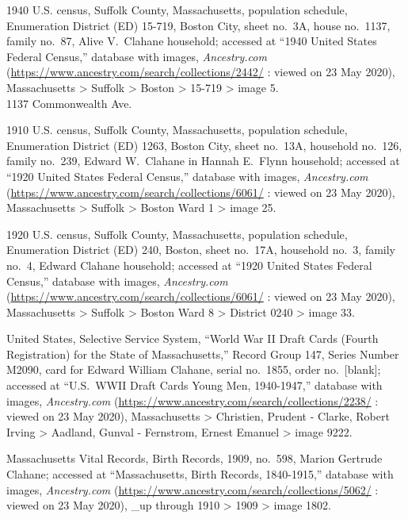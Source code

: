 \begin{thebibliography}{999}
	1940 U.S. census, Suffolk County, Massachusetts, population schedule, Enumeration District (ED) 15-719, Boston City, sheet no.\ 3A, house no.\ 1137, family no.\ 87, Alive V.\ Clahane household; accessed at ``1940 United States Federal Census,'' database with images, \textit{Ancestry.com} (\url{https://www.ancestry.com/search/collections/2442/} : viewed on 23 May 2020), Massachusetts > Suffolk > Boston > 15-719 > image 5.\\
	1137 Commonwealth Ave.
	
	1910 U.S. census, Suffolk County, Massachusetts, population schedule, Enumeration District (ED) 1263, Boston City, sheet no.\ 13A, household no.\ 126, family no.\ 239, Edward W.\ Clahane in Hannah E.\ Flynn household; accessed at ``1920 United States Federal Census,'' database with images, \textit{Ancestry.com} (\url{https://www.ancestry.com/search/collections/6061/} : viewed on 23 May 2020), Massachusetts > Suffolk > Boston Ward 1 > image 25.
	
	1920 U.S. census, Suffolk County, Massachusetts, population schedule, Enumeration District (ED) 240, Boston, sheet no.\ 17A, household no.\ 3, family no.\ 4, Edward Clahane household; accessed at ``1920 United States Federal Census,'' database with images, \textit{Ancestry.com} (\url{https://www.ancestry.com/search/collections/6061/} : viewed on 23 May 2020), Massachusetts > Suffolk > Boston Ward 8 > District 0240 > image 33.
	
	United States, Selective Service System, ``World War II Draft Cards (Fourth Registration) for the State of Massachusetts,'' Record Group 147, Series Number M2090, card for Edward William Clahane, serial no.\ 1855, order no.\ [blank]; accessed at ``U.S.\ WWII Draft Cards Young Men, 1940-1947,'' database with images, \textit{Ancestry.com} (\url{https://www.ancestry.com/search/collections/2238/} : viewed on 23 May 2020), Massachusetts > Christien, Prudent - Clarke, Robert Irving > Aadland, Gunval - Fernstrom, Ernest Emanuel > image 9222.
	
	Massachusetts Vital Records, Birth Records, 1909, no.\ 598, Marion Gertrude Clahane; accessed at ``Massachusetts, Birth Records, 1840-1915,'' database with images, \textit{Ancestry.com} (\url{https://www.ancestry.com/search/collections/5062/} : viewed on 23 May 2020), \_up through 1910 > 1909 > image 1802.
	

\end{thebibliography}
